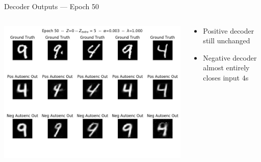 \documentclass[11pt,dvipsnames,usenames,aspectratio=169]{beamer}  %
\newcommand{\blue}[1]{{\color{Blue} #1}}
\newcommand{\red}[1]{{\color{red} #1}}
\begin{document}
\begin{frame}{Decoder Outputs --- Epoch \red{50}}
  \begin{columns}
    \begin{column}{0.59\textwidth}
      \begin{center}
        \includegraphics[scale=0.44]{deep-pu_epoch=050.jpg}
      \end{center}
    \end{column}
    \begin{column}{0.41\textwidth}
      \begin{itemize}[<+->]
        \setlength{\itemsep}{20pt}
        \item Positive decoder still unchanged
        \item Negative decoder almost entirely closes input \blue{$4$}s
      \end{itemize}
    \end{column}
  \end{columns}
\end{frame}
\end{document}
